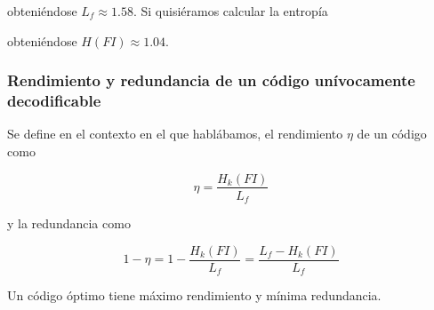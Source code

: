 obteniéndose \(L_f\approx 1.58\). Si quisiéramos calcular la entropía

\begin{Shaded}
\begin{Highlighting}[]
\NormalTok{(df[}\NormalTok{]}\OperatorTok{*}\NormalTok{df[}\NormalTok{]).}\NormalTok{()}
\end{Highlighting}
\end{Shaded}

obteniéndose \(H(FI)\approx 1.04\).

\subsubsection{Rendimiento y redundancia de un código unívocamente
decodificable}\label{rendimiento-y-redundancia-de-un-cuxf3digo-unuxedvocamente-decodificable}

Se define en el contexto en el que hablábamos, el rendimiento \(\eta\)
de un código como

\[
\eta = \frac{H_k(FI)}{L_f}
\]

y la redundancia como

\[
1 - \eta = 1 - \frac{H_k(FI)}{L_f} = \frac{L_f - H_k(FI)}{L_f}
\]

Un código óptimo tiene máximo rendimiento y mínima redundancia.
